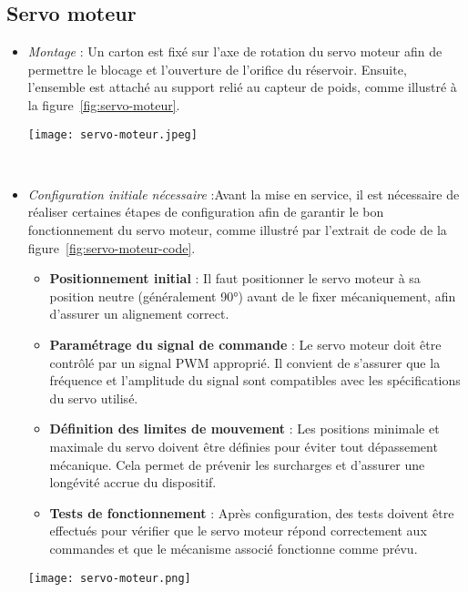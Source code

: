 \subsection{Servo moteur}
\begin{itemize}
	\item \textit{Montage} : Un carton est fixé sur l'axe de rotation du servo moteur afin de permettre le blocage et l'ouverture de l'orifice du réservoir. Ensuite, l'ensemble est attaché au support relié au capteur de poids, comme illustré à la figure~\ref{fig:servo-moteur}.
	
	\begin{minipage}{\linewidth}
  		\centering
  		\texttt{[image: servo-moteur.jpeg]}
  		\label{fig:servo-moteur}
	\end{minipage}
	\\
	\item \textit{Configuration initiale nécessaire} :Avant la mise en service, il est nécessaire de réaliser certaines étapes de configuration afin de garantir le bon fonctionnement du servo moteur, comme illustré par l'extrait de code de la figure~\ref{fig:servo-moteur-code}.
	\begin{itemize}
		\item \textbf{Positionnement initial} : Il faut positionner le servo moteur à sa position neutre (généralement 90°) avant de le fixer mécaniquement, afin d'assurer un alignement correct.
		\item \textbf{Paramétrage du signal de commande} : Le servo moteur doit être contrôlé par un signal PWM approprié. Il convient de s'assurer que la fréquence et l'amplitude du signal sont compatibles avec les spécifications du servo utilisé.
		\item \textbf{Définition des limites de mouvement} : Les positions minimale et maximale du servo doivent être définies pour éviter tout dépassement mécanique. Cela permet de prévenir les surcharges et d'assurer une longévité accrue du dispositif.
		\item \textbf{Tests de fonctionnement} : Après configuration, des tests doivent être effectués pour vérifier que le servo moteur répond correctement aux commandes et que le mécanisme associé fonctionne comme prévu.
	\end{itemize}
	
	\begin{minipage}{\linewidth}
  		\centering
  		\texttt{[image: servo-moteur.png]}
  		\label{fig:servo-moteur-code}
	\end{minipage}
\end{itemize}



